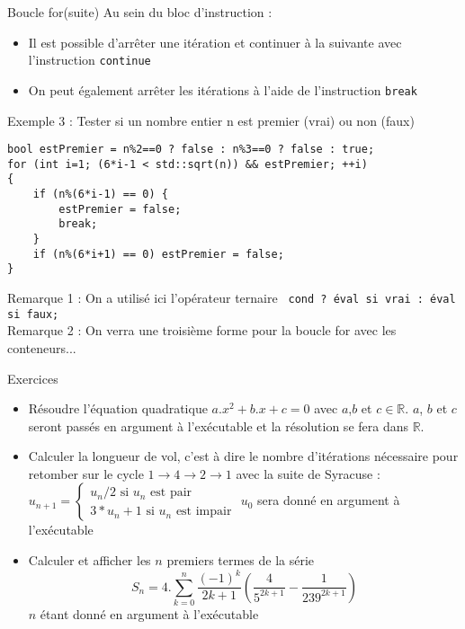 \documentclass[compress,10pt,aspectratio=169]{beamer}
\begin{document}
\begin{frame}[fragile]{Boucle for(suite)}
    \scriptsize 
    Au sein du bloc d'instruction :
    \begin{itemize}
    \item Il est possible d'arrêter une itération et continuer à la suivante avec l'instruction \texttt{continue}
    \item On peut également arrêter les itérations à l'aide de l'instruction \texttt{break}
    \end{itemize}

    \begin{exampleblock}{\scriptsize Exemple 3 : Tester si un nombre entier n est premier (vrai) ou non (faux)}
\begin{verbatim}
bool estPremier = n%2==0 ? false : n%3==0 ? false : true;
for (int i=1; (6*i-1 < std::sqrt(n)) && estPremier; ++i)
{
    if (n%(6*i-1) == 0) {
        estPremier = false;
        break;
    }
    if (n%(6*i+1) == 0) estPremier = false;
}
\end{verbatim}
\end{exampleblock}
\alert{Remarque 1} : On a utilisé ici l'opérateur ternaire  \texttt{ cond ? éval si vrai : éval si faux;}\\
\alert{Remarque 2} : On verra une troisième forme pour la boucle for avec les conteneurs...
\end{frame}

\begin{frame}{Exercices}
    \scriptsize
    \begin{itemize}
    \item Résoudre l'équation quadratique $a.x^{2}+b.x+c = 0$ avec $a$,$b$ et $c\in\mathbb{R}$. $a$, $b$ et $c$ seront
    passés en argument à l'exécutable et la résolution se fera dans $\mathbb{R}$.
    \item Calculer la longueur de vol, c'est à dire le nombre d'itérations nécessaire pour retomber sur le cycle 
    $1\rightarrow 4 \rightarrow 2 \rightarrow 1$ avec la suite de Syracuse : $u_{n+1} = \left\{ \begin{array}{l}
        u_{n}/2 \mbox{ si } u_{n}\mbox{ est pair} \\
        3*u_{n}+1 \mbox{ si } u_{n}\mbox{ est impair}\end{array}\right.$
        $u_{0}$ sera donné en argument à l'exécutable
    \item Calculer et afficher les $n$ premiers termes de la série
    \[
        S_{n} = 4.\sum_{k=0}^{n} \frac{(-1)^{k}}{2k+1}\left(\frac{4}{5^{2k+1}} - \frac{1}{239^{2k+1}}\right)
    \]
    $n$ étant donné en argument à l'exécutable
    \end{itemize}
\end{frame}
\end{document}
